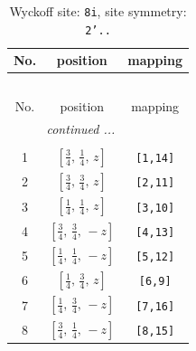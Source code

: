 \documentclass[fleqn,8pt]{jsarticle}
\begin{document}
\renewcommand{\arraystretch}{1.2}
\begin{longtable}{ccc}
\caption{Wyckoff site: {\tt 8i}, site symmetry: {\tt 2'..}}
 \\
 \hline \hline
No. & position & mapping \\ \hline \endfirsthead

\multicolumn{2}{l}{\tablename\ \thetable{}} \\
 \hline \hline
No. & position & mapping \\ \hline \endhead

 \hline \hline
\multicolumn{2}{r}{\footnotesize\it continued ...} \\ \endfoot

 \hline \hline
\multicolumn{2}{r}{} \\ \endlastfoot

1 & $\left[ \frac{3}{4},\, \frac{1}{4},\, z \right]$ & {\tt [1,14]} \\ \hline
2 & $\left[ \frac{3}{4},\, \frac{3}{4},\, z \right]$ & {\tt [2,11]} \\ \hline
3 & $\left[ \frac{1}{4},\, \frac{1}{4},\, z \right]$ & {\tt [3,10]} \\ \hline
4 & $\left[ \frac{3}{4},\, \frac{3}{4},\, - z \right]$ & {\tt [4,13]} \\ \hline
5 & $\left[ \frac{1}{4},\, \frac{1}{4},\, - z \right]$ & {\tt [5,12]} \\ \hline
6 & $\left[ \frac{1}{4},\, \frac{3}{4},\, z \right]$ & {\tt [6,9]} \\ \hline
7 & $\left[ \frac{1}{4},\, \frac{3}{4},\, - z \right]$ & {\tt [7,16]} \\ \hline
8 & $\left[ \frac{3}{4},\, \frac{1}{4},\, - z \right]$ & {\tt [8,15]} \\
\end{longtable}
\renewcommand{\arraystretch}{1.2}
\end{document}
